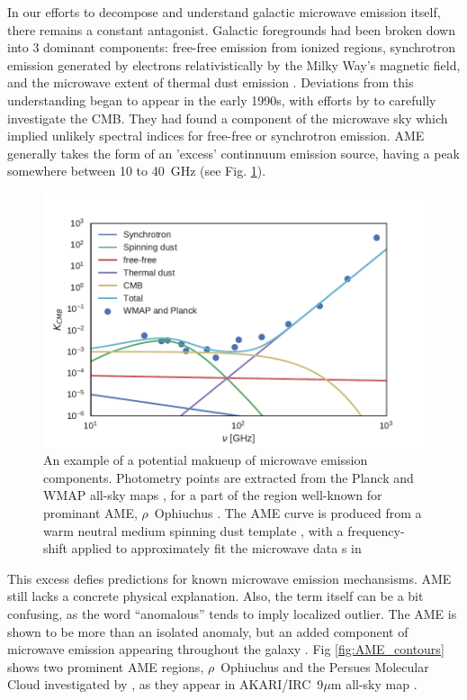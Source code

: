       In our efforts to decompose and understand galactic microwave emission itself, there remains a constant antagonist. Galactic foregrounds had been broken down into 3 dominant components: free-free emission from ionized regions, synchrotron emission generated by electrons relativistically by the Milky Way's magnetic field, and the microwave extent of thermal dust emission \citep{wmap03b, leach08, planckXII}. Deviations from this understanding began to appear in the early 1990s, with efforts by \cite{kogut96, leitch97} to carefully investigate the CMB. They had found a component of the microwave sky which implied unlikely spectral indices for free-free or synchrotron emission. AME generally takes the form of an 'excess' continnuum emission source, having a peak somewhere between 10 to 40~GHz (see Fig. \ref{fig:mw_foregrounds_demo_rOph}).
            \begin{figure}
              \centering
              \includegraphics[width=\textwidth]{../Plots/ch_intro/mw_foregrounds_demo_rOph.pdf}
                \caption{An example of a potential makueup of microwave emission components. Photometry points are extracted from the Planck and WMAP all-sky maps \citep{hfi14viii}, for a part of the region well-known for prominant AME, $\rho$~Ophiuchus \citep{planckxx11}. The AME curve is produced from a warm neutral medium spinning dust template \citep{ali-haimoud09}, with a frequency-shift applied to approximately fit the microwave data s in \cite{planck15X}}
              \label{fig:mw_foregrounds_demo_rOph}
            \end{figure}
        This excess defies predictions for known microwave emission mechansisms. AME still lacks a concrete physical explanation. Also, the term itself can be a bit confusing, as the word ``anomalous'' tends to imply localized outlier. The AME is shown to be more than an isolated anomaly, but an added component of microwave emission appearing throughout the galaxy \citep{deoliveiracosta97,wmap03b,dickinson13r}. Fig \ref{fig:AME_contours} shows two prominent AME regions, $\rho{}$~Ophiuchus and the Persues Molecular Cloud investigated by \cite{tibbs11,planckxx11}, as they appear in AKARI/IRC~9$\mu$m all-sky map \citep{ishihara10}.
